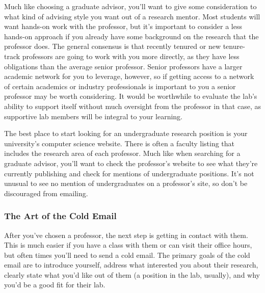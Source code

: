 \documentclass[12pt]{article}
\begin{document}
Much like choosing a graduate advisor, you'll want to give some consideration to what kind of advising style you want out of a research mentor. Most students will want hands-on work with the professor, but it's important to consider a less hands-on approach if you already have some background on the research that the professor does. The general consensus is that recently tenured or new tenure-track professors are going to work with you more directly, as they have less obligations than the average senior professor. Senior professors have a larger academic network for you to leverage, however, so if getting access to a network of certain academics or industry professionals is important to you a senior professor may be worth considering. It would be worthwhile to evaluate the lab's ability to support itself without much oversight from the professor in that case, as supportive lab members will be integral to your learning.

The best place to start looking for an undergraduate research position is your university's computer science website. There is often a faculty listing that includes the research area of each professor. Much like when searching for a graduate advisor, you'll want to check the professor's website to see what they're currently publishing and check for mentions of undergraduate positions. It's not unusual to see no mention of undergraduates on a professor's site, so don't be discouraged from emailing.

\subsubsection{The Art of the Cold Email}

After you've chosen a professor, the next step is getting in contact with them. This is much easier if you have a class with them or can visit their office hours, but often times you'll need to send a cold email. The primary goals of the cold email are to introduce yourself, address what interested you about their research, clearly state what you'd like out of them (a position in the lab, usually), and why you'd be a good fit for their lab. \cite{berkeleycoldemail}
\end{document}
